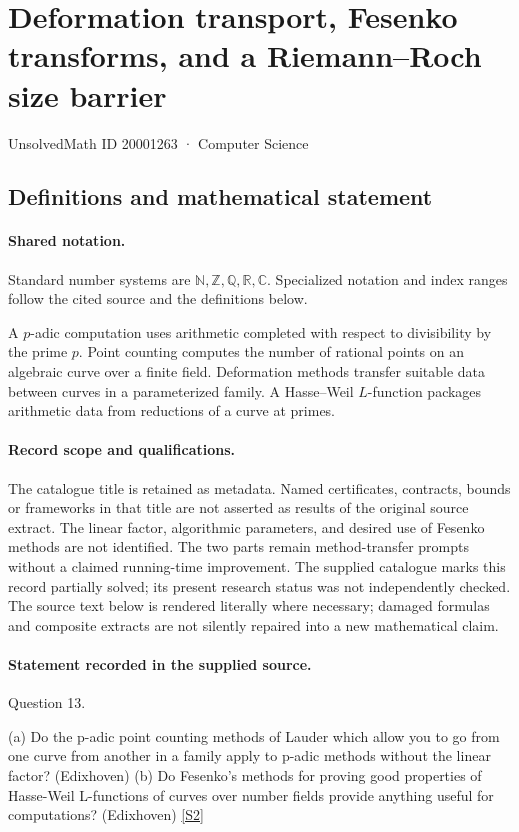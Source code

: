 \documentclass[11pt]{article}
\newcommand{\sref}[2]{\hyperlink{source:#1:#2}{[S#2]}}
\begin{document}
\setcounter{section}{20001262}
\section{Deformation transport, Fesenko transforms, and a Riemann--Roch size barrier}\label{20001263}
{\small\sffamily UnsolvedMath ID 20001263 · Computer Science}
\subsection{Definitions and mathematical statement}

\paragraph{Shared notation.}Standard number systems are $\mathbb N,\mathbb Z,\mathbb Q,\mathbb R,\mathbb C$. Specialized notation and index ranges follow the cited source and the definitions below.


A $p$-adic computation uses arithmetic completed with respect to divisibility by the prime $p$. Point counting computes the number of rational points on an algebraic curve over a finite field. Deformation methods transfer suitable data between curves in a parameterized family. A Hasse--Weil $L$-function packages arithmetic data from reductions of a curve at primes.
\paragraph{Record scope and qualifications.}
The catalogue title is retained as metadata. Named certificates, contracts, bounds or frameworks in that title are not asserted as results of the original source extract.
The linear factor, algorithmic parameters, and desired use of Fesenko methods are not identified. The two parts remain method-transfer prompts without a claimed running-time improvement. The supplied catalogue marks this record partially solved; its present research status was not independently checked.
The source text below is rendered literally where necessary; damaged formulas and composite extracts are not silently repaired into a new mathematical claim.
\paragraph{Statement recorded in the supplied source.}
Question 13.

(a) Do the p-adic point counting methods of Lauder which allow you to go from one curve from another in a family apply to p-adic methods without the linear factor? (Edixhoven) (b) Do Fesenko's methods for proving good properties of Hasse-Weil L-functions of curves over number fields provide anything useful for computations? (Edixhoven) \sref{20001263}{2}
\end{document}
